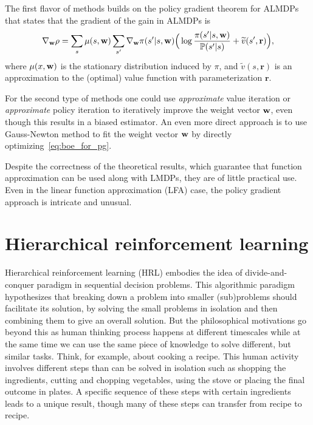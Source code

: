 The first flavor of methods builds on the policy gradient theorem for ALMDPs~\citep[cf.~Theorem 1]{Todorov2010} that states that the gradient of the gain in ALMDPs is
\begin{equation}
  \nabla_{\mathbf{w}} \rho = \sum_{s}\mu(s, \mathbf{w}) \sum_{s'} \nabla_{\mathbf{w}} \pi(s'\lvert s, \mathbf{w})\Big( \log \frac{\pi(s'\lvert s, \mathbf{w})}{\mathbb{P}(s'\lvert s)} + \widetilde v(s', \mathbf{r})\Big),
\end{equation}
where $\mu(x, \mathbf{w})$ is the stationary distribution induced by $\pi$, and $\widetilde v(s,\mathbf{r})$ is an approximation to the (optimal) value function with parameterization $\mathbf r$.

For the second type of methods one could use \textit{approximate} value iteration or \textit{approximate} policy iteration to iteratively improve the weight vector $\mathbf{w}$, even though this results in a biased estimator. An even more direct approach is to use Gauss-Newton method to fit the weight vector $\mathbf{w}$ by directly optimizing~\eqref{eq:boe_for_pg}.

Despite the correctness of the theoretical results, which guarantee that function approximation can be used along with LMDPs, they are of little practical use. Even in the linear function approximation (LFA) case, the policy gradient approach is intricate and unusual. 


\section{Hierarchical reinforcement learning}
Hierarchical reinforcement learning (HRL) embodies the idea of divide-and-conquer paradigm in sequential decision problems. This algorithmic paradigm hypothesizes that breaking down a problem into smaller (sub)problems should facilitate its solution, by solving the small problems in isolation and then combining them to give an overall solution. But the philosophical motivations go beyond this as human thinking process happens at different timescales while at the same time we can use the same piece of knowledge to solve different, but similar tasks. Think, for example, about cooking a recipe. This human activity involves different steps than can be solved in isolation such as shopping the ingredients, cutting and chopping vegetables, using the stove or placing the final outcome in plates. A specific sequence of these steps with certain ingredients leads to a unique result, though many of these steps can transfer from recipe to recipe.

